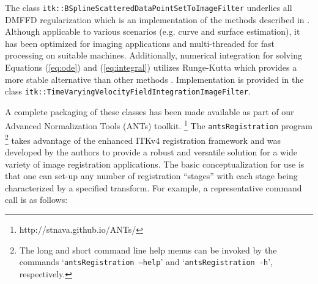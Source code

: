 \documentclass{frontiersSCNS}
\begin{document}
The class {\tt itk::BSplineScatteredDataPointSetToImageFilter} underlies all DMFFD regularization which is an implementation of the 
methods described in \cite{tustison2006}.  Although applicable to
various scenarios (e.g. curve and surface estimation), it has
been optimized for imaging applications and multi-threaded
for fast processing on suitable machines.
Additionally, numerical integration for solving Equations (\ref{eq:ode}) and (\ref{eq:integral}) utilizes Runge-Kutta which
provides a more stable alternative than other
methods \citep{press2007}.  Implementation is provided in the class {\tt itk::TimeVaryingVelocityFieldIntegrationImageFilter}.

A complete packaging of these classes has been made
available as part of our Advanced Normalization Tools (ANTs) toolkit.%
\footnote{
http://stnava.github.io/ANTs/
}
The \verb#antsRegistration# program%
\footnote{
The long and short command line help menus can be invoked by
the commands `{\tt antsRegistration --help}' and `{\tt antsRegistration -h}', respectively.
}
takes advantage of the enhanced ITKv4
registration framework and was developed by the 
authors to provide a robust and versatile solution for a wide variety of
image registration applications. The basic conceptualization for use is that one 
can
set-up any number of registration ``stages'' with each stage being 
characterized by a specified transform.  For example, a representative 
command call is as follows:
\vspace{2mm}
\end{document}

